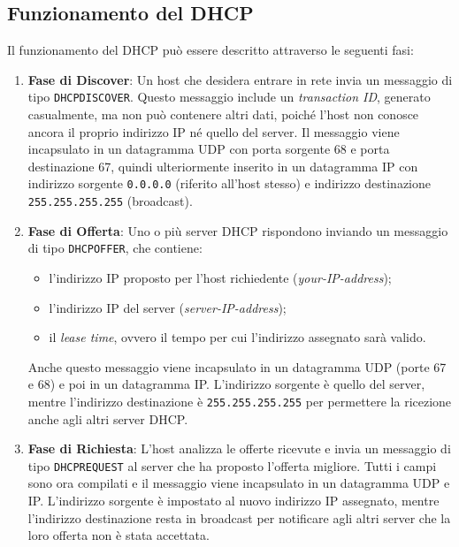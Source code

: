 \documentclass[12pt]{report}
\begin{document}
\subsection{Funzionamento del DHCP}
Il funzionamento del DHCP può essere descritto attraverso le seguenti fasi:
\begin{enumerate}
    \item \textbf{Fase di Discover}:  
    Un host che desidera entrare in rete invia un messaggio di tipo \texttt{DHCPDISCOVER}. Questo messaggio include un \emph{transaction ID}, generato casualmente, ma non può contenere altri dati, poiché l'host non conosce ancora il proprio indirizzo IP né quello del server. Il messaggio viene incapsulato in un datagramma UDP con porta sorgente 68 e porta destinazione 67, quindi ulteriormente inserito in un datagramma IP con indirizzo sorgente \texttt{0.0.0.0} (riferito all'host stesso) e indirizzo destinazione \texttt{255.255.255.255} (broadcast).

    \item \textbf{Fase di Offerta}:  
    Uno o più server DHCP rispondono inviando un messaggio di tipo \texttt{DHCPOFFER}, che contiene:  
    \begin{itemize}
        \item l'indirizzo IP proposto per l'host richiedente (\emph{your-IP-address});
        \item l'indirizzo IP del server (\emph{server-IP-address});
        \item il \emph{lease time}, ovvero il tempo per cui l'indirizzo assegnato sarà valido.
    \end{itemize}
    Anche questo messaggio viene incapsulato in un datagramma UDP (porte 67 e 68) e poi in un datagramma IP. L'indirizzo sorgente è quello del server, mentre l'indirizzo destinazione è \texttt{255.255.255.255} per permettere la ricezione anche agli altri server DHCP.

    \item \textbf{Fase di Richiesta}:  
    L'host analizza le offerte ricevute e invia un messaggio di tipo \texttt{DHCPREQUEST} al server che ha proposto l'offerta migliore. Tutti i campi sono ora compilati e il messaggio viene incapsulato in un datagramma UDP e IP. L'indirizzo sorgente è impostato al nuovo indirizzo IP assegnato, mentre l'indirizzo destinazione resta in broadcast per notificare agli altri server che la loro offerta non è stata accettata.


\end{enumerate}
\end{document}
